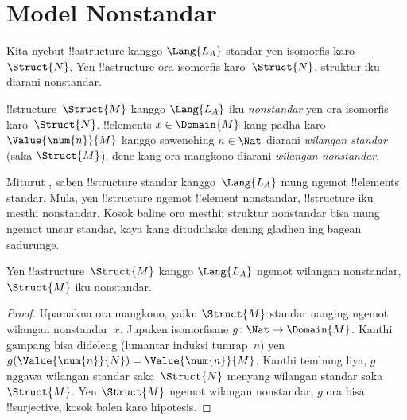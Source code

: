 \documentclass[../../../include/open-logic-section]{subfiles}
\begin{document}
\section{Model Nonstandar}

\begin{explain}
Kita nyebut !!a{structure}
kanggo $\Lang{L_A}$ standar
yen isomorfis
karo~$\Struct{N}$.
Yen !!a{structure}
ora isomorfis
karo~$\Struct{N}$,
struktur iku diarani
nonstandar.
\end{explain}

\begin{defn}
!!{structure}~$\Struct{M}$
kanggo $\Lang{L_A}$
iku \emph{nonstandar}
yen ora isomorfis
karo~$\Struct{N}$.
!!{element}s
$x \in \Domain{M}$
kang padha karo
$\Value{\num{n}}{M}$
kanggo sawenehing
$n \in \Nat$
diarani \emph{wilangan standar}
(saka $\Struct{M}$),
dene kang ora mangkono
diarani \emph{wilangan nonstandar}.
\end{defn}

\begin{explain}
Miturut
,
saben !!{structure} standar
kanggo~$\Lang{L_A}$
mung ngemot !!{element}s
standar. Mula, yen
!!{structure} ngemot
!!{element} nonstandar,
!!{structure} iku mesthi
nonstandar.
Kosok baline ora mesthi:
struktur nonstandar bisa
mung ngemot unsur standar,
kaya kang dituduhake
dening gladhen ing bagean
sadurunge.
\end{explain}

\begin{prop}
Yen !!a{structure}~$\Struct{M}$
kanggo $\Lang{L_A}$
ngemot wilangan nonstandar,
$\Struct{M}$ iku nonstandar.
\end{prop}

\begin{proof}
Upamakna ora mangkono,
yaiku $\Struct{M}$
standar nanging ngemot
wilangan nonstandar~$x$.
Jupuken isomorfisme
$g\colon \Nat \to \Domain{M}$.
Kanthi gampang bisa
dideleng (lumantar induksi
tumrap~$n$) yen
$g(\Value{\num{n}}{N}) =
\Value{\num{n}}{M}$.
Kanthi tembung liya,
$g$ nggawa wilangan
standar saka~$\Struct{N}$
menyang wilangan standar
saka~$\Struct{M}$.
Yen $\Struct{M}$
ngemot wilangan nonstandar,
$g$ ora bisa
!!{surjective},
kosok balen karo hipotesis.
\end{proof}
\end{document}
